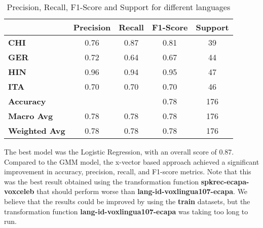 \documentclass{Interspeech2024}
\begin{document}
\begin{table}[h!]
  \centering
  \begin{tabular}{lcccc}
    \hline
                          & \textbf{Precision} & \textbf{Recall} & \textbf{F1-Score} & \textbf{Support} \\
    \hline
    \textbf{CHI}          & 0.76               & 0.87            & 0.81              & 39               \\
    \textbf{GER}          & 0.72               & 0.64            & 0.67              & 44               \\
    \textbf{HIN}          & 0.96               & 0.94            & 0.95              & 47               \\
    \textbf{ITA}          & 0.70               & 0.70            & 0.70              & 46               \\
    \hline
    \textbf{Accuracy}     &                    &                 & 0.78              & 176              \\
    \textbf{Macro Avg}    & 0.78               & 0.78            & 0.78              & 176              \\
    \textbf{Weighted Avg} & 0.78               & 0.78            & 0.78              & 176              \\
    \hline
  \end{tabular}
  \caption{Precision, Recall, F1-Score and Support for different languages}
  \label{table:metrics}
\end{table}

The best model was the Logistic Regression, with an overall score of 0.87.
Compared to the GMM model, the x-vector based approach achieved a significant
improvement in accuracy, precision, recall, and F1-score metrics. Note that
this was the best result obtained using the transformation function
\textbf{spkrec-ecapa-voxceleb} that should perform worse than
\textbf{lang-id-voxlingua107-ecapa}. We believe that the results could be
improved by using the \textbf{train} datasets, but the transformation function 
\textbf{lang-id-voxlingua107-ecapa} was taking too long to run.
\end{document}
